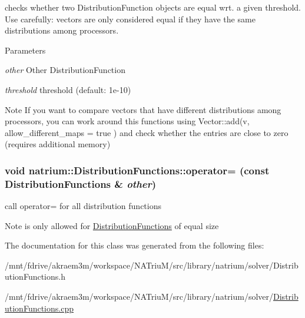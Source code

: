 checks whether two DistributionFunction objects are equal wrt. a given threshold. Use carefully: vectors are only considered equal if they have the same distributions among processors. 
\begin{DoxyParams}{Parameters}
\item[{\em other}]Other DistributionFunction \item[{\em threshold}]threshold (default: 1e-\/10) \end{DoxyParams}
\begin{DoxyNote}{Note}
If you want to compare vectors that have different distributions among processors, you can work around this functions using Vector::add(v, allow\_\-different\_\-maps = true ) and check whether the entries are close to zero (requires additional memory) 
\end{DoxyNote}
\hypertarget{classnatrium_1_1DistributionFunctions_a5e61cb3ba258cf0958e1557061ed31b9}{
\subsubsection[{operator=}]{\setlength{\rightskip}{0pt plus 5cm}void natrium::DistributionFunctions::operator= (const {\bf DistributionFunctions} \& {\em other})}}
\label{classnatrium_1_1DistributionFunctions_a5e61cb3ba258cf0958e1557061ed31b9}


call operator= for all distribution functions \begin{DoxyNote}{Note}
is only allowed for \hyperlink{classnatrium_1_1DistributionFunctions}{DistributionFunctions} of equal size 
\end{DoxyNote}


The documentation for this class was generated from the following files:\begin{DoxyCompactItemize}
\item 
/mnt/fdrive/akraem3m/workspace/NATriuM/src/library/natrium/solver/DistributionFunctions.h\item 
/mnt/fdrive/akraem3m/workspace/NATriuM/src/library/natrium/solver/\hyperlink{DistributionFunctions_8cpp}{DistributionFunctions.cpp}\end{DoxyCompactItemize}

